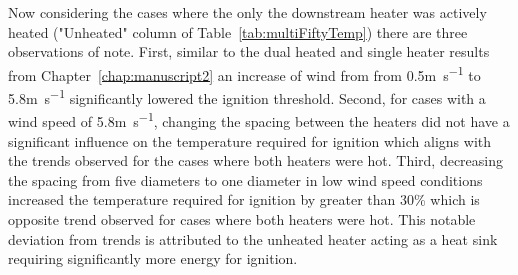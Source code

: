     Now considering the cases where the only the downstream heater was actively heated ("Unheated" column of Table~\ref{tab:multiFiftyTemp}) there are three observations of note. First, similar to the dual heated and single heater results from Chapter~\ref{chap:manuscript2} an increase of wind from from 0.5\si{\meter\per\second} to 5.8\si{\meter\per\second} significantly lowered the ignition threshold. Second, for cases with a wind speed of 5.8\si{\meter\per\second}, changing the spacing between the heaters did not have a significant influence on the temperature required for ignition which aligns with the trends observed for the cases where both heaters were hot. Third, decreasing the spacing from five diameters to one diameter in low wind speed conditions increased the temperature required for ignition by greater than 30\% which is opposite trend observed for cases where both heaters were hot. This notable deviation from trends is attributed to the unheated heater acting as a heat sink requiring significantly more energy for ignition. 
    

